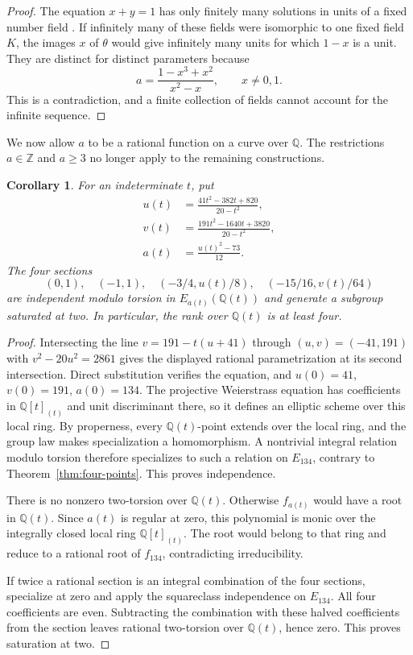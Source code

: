 \documentclass[11pt,leqno,oneside,letterpaper]{amsart}
\newtheorem{corollary}[theorem]{Corollary}
\theoremstyle{remark}
\numberwithin{equation}{section}
\newcommand{\Q}{\mathbb Q}
\newcommand{\Z}{\mathbb Z}
\begin{document}
\begin{proof}
  The equation $x+y=1$ has only finitely many solutions in units of a fixed number field \cite[Theorem IX.4.1]{Silverman2009}. If infinitely many of these fields were isomorphic to one fixed field $K$, the images $x$ of $\theta$ would give infinitely many units for which $1-x$ is a unit. They are distinct for distinct parameters because
  \[
    a=\frac{1-x^3+x^2}{x^2-x},\qquad x\ne0,1.
  \]
  This is a contradiction, and a finite collection of fields cannot account for the infinite sequence.
\end{proof}

We now allow $a$ to be a rational function on a curve over $\Q$. The restrictions $a\in\Z$ and $a\geq3$ no longer apply to the remaining constructions.

\begin{corollary}\label{cor:rational-family}
  For an indeterminate $t$, put
  \begin{align*}
    u(t) & =\frac{41t^2-382t+820}{20-t^2},    \\
    v(t) & =\frac{191t^2-1640t+3820}{20-t^2}, \\
    a(t) & =\frac{u(t)^2-73}{12}.
  \end{align*}
  The four sections
  \[
    (0,1),\quad(-1,1),\quad(-3/4,u(t)/8),\quad(-15/16,v(t)/64)
  \]
  are independent modulo torsion in $E_{a(t)}(\Q(t))$ and generate a subgroup saturated at two. In particular, the rank over $\Q(t)$ is at least four.
\end{corollary}

\begin{proof}
  Intersecting the line $v=191-t(u+41)$ through $(u,v)=(-41,191)$ with $v^2-20u^2=2861$ gives the displayed rational parametrization at its second intersection. Direct substitution verifies the equation, and $u(0)=41$, $v(0)=191$, $a(0)=134$. The projective Weierstrass equation has coefficients in $\Q[t]_{(t)}$ and unit discriminant there, so it defines an elliptic scheme over this local ring. By properness, every $\Q(t)$-point extends over the local ring, and the group law makes specialization a homomorphism. A nontrivial integral relation modulo torsion therefore specializes to such a relation on $E_{134}$, contrary to Theorem~\ref{thm:four-points}. This proves independence.

  There is no nonzero two-torsion over $\Q(t)$. Otherwise $f_{a(t)}$ would have a root in $\Q(t)$. Since $a(t)$ is regular at zero, this polynomial is monic over the integrally closed local ring $\Q[t]_{(t)}$. The root would belong to that ring and reduce to a rational root of $f_{134}$, contradicting irreducibility.

  If twice a rational section is an integral combination of the four sections, specialize at zero and apply the squareclass independence on $E_{134}$. All four coefficients are even. Subtracting the combination with these halved coefficients from the section leaves rational two-torsion over $\Q(t)$, hence zero. This proves saturation at two.
\end{proof}
\end{document}
